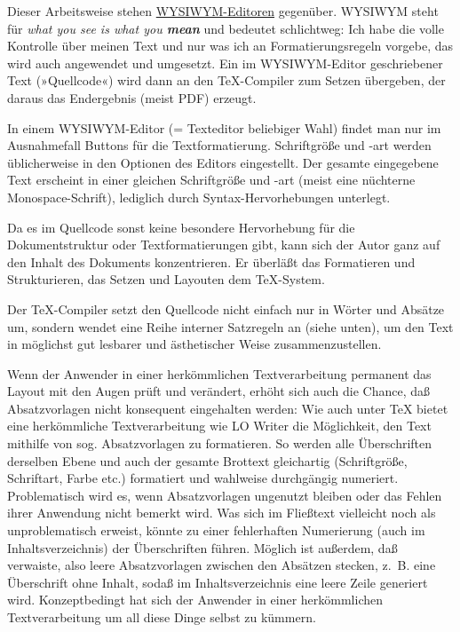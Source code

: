 \documentclass[11pt,a4paper,ngerman,DIV=8]{scrartcl}
\begin{document}
Dieser Arbeitsweise stehen \href{https://www.teuderun.de/latex/editor/\%C3\%BCbersicht/}{WYSIWYM-Editoren} gegenüber. WYSIWYM steht für \emph{what you see is what you \textbf{mean}} und bedeutet schlichtweg: Ich habe die volle Kontrolle über meinen Text und nur was ich an Formatierungsregeln vorgebe, das wird auch angewendet und umgesetzt. Ein im WYSIWYM-Editor geschriebener Text (»Quellcode«) wird dann an den \TeX{}-Compiler zum Setzen übergeben, der daraus das Endergebnis (meist PDF) erzeugt.

In einem WYSIWYM-Editor (= Texteditor beliebiger Wahl) findet man nur im Ausnahmefall Buttons für die Textformatierung. Schriftgröße und -art werden üblicherweise in den Optionen des Editors eingestellt. Der gesamte eingegebene Text erscheint in einer gleichen Schriftgröße und -art (meist eine nüchterne Monospace-Schrift), lediglich durch Syntax-Hervorhebungen unterlegt\footnotemark{}.

Da es im Quellcode sonst keine besondere Hervorhebung für die Dokumentstruktur oder Textformatierungen gibt, kann sich der Autor ganz auf den Inhalt des Dokuments konzentrieren. Er überläßt das Formatieren und Strukturieren, das Setzen und Layouten dem \TeX{}-System.

Der \TeX{}-Compiler setzt den Quellcode nicht einfach nur in Wörter und Absätze um, sondern wendet eine Reihe interner Satzregeln an (siehe unten), um den Text in möglichst gut lesbarer und ästhetischer Weise zusammenzustellen.

Wenn der Anwender in einer herkömmlichen Textverarbeitung permanent das Layout mit den Augen prüft und verändert, erhöht sich auch die Chance, daß Absatzvorlagen nicht konsequent eingehalten werden: Wie auch unter \TeX{} bietet eine herkömmliche Textverarbeitung wie LO Writer die Möglichkeit, den Text mithilfe von sog. Absatzvorlagen zu formatieren. So werden alle Überschriften derselben Ebene und auch der gesamte Brottext gleichartig (Schriftgröße, Schriftart, Farbe etc.) formatiert und wahlweise durchgängig numeriert. Problematisch wird es, wenn Absatzvorlagen ungenutzt bleiben oder das Fehlen ihrer Anwendung nicht bemerkt wird. Was sich im Fließtext vielleicht noch als unproblematisch erweist, könnte zu einer fehlerhaften Numerierung (auch im Inhaltsverzeichnis) der Überschriften führen. Möglich ist außerdem, daß verwaiste, also leere Absatzvorlagen zwischen den Absätzen stecken, z.~B. eine Überschrift ohne Inhalt, sodaß im Inhaltsverzeichnis eine leere Zeile generiert wird. Konzeptbedingt hat sich der Anwender in einer herkömmlichen Textverarbeitung um all diese Dinge selbst zu kümmern\footnotemark{}.
\end{document}

